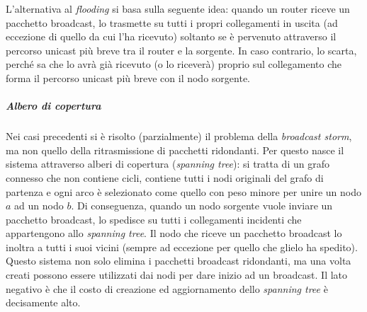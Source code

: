 L'alternativa al \textit{flooding} si basa sulla seguente idea: quando un router riceve un pacchetto broadcast, lo trasmette su tutti i propri collegamenti in uscita (ad eccezione di quello da cui l'ha ricevuto) soltanto se è pervenuto attraverso il percorso unicast più breve tra il router e la sorgente. In caso contrario, lo scarta, perché sa che lo avrà già ricevuto (o lo riceverà) proprio sul collegamento che forma il percorso unicast più breve con il nodo sorgente.
\subparagraph{Albero di copertura}
Nei casi precedenti si è risolto (parzialmente) il problema della \textit{broadcast storm}, ma non quello della ritrasmissione di pacchetti ridondanti. Per questo nasce il sistema attraverso alberi di copertura (\textit{spanning tree}): si tratta di un grafo connesso che non contiene cicli, contiene tutti i nodi originali del grafo di partenza e ogni arco è selezionato come quello con peso minore per unire un nodo $a$ ad un nodo $b$. Di conseguenza, quando un nodo sorgente vuole inviare un pacchetto broadcast, lo spedisce su tutti i collegamenti incidenti che appartengono allo \textit{spanning tree}. Il nodo che riceve un pacchetto broadcast lo inoltra a tutti i suoi vicini (sempre ad eccezione per quello che glielo ha spedito). Questo sistema non solo elimina i pacchetti broadcast ridondanti, ma una volta creati possono essere utilizzati dai nodi per dare inizio ad un broadcast. Il lato negativo è che il costo di creazione ed aggiornamento dello \textit{spanning tree} è decisamente alto.

